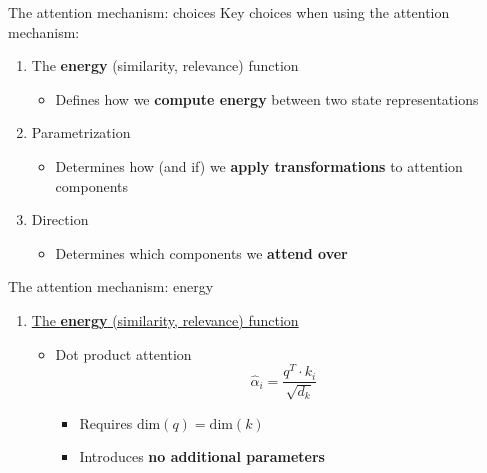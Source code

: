 \documentclass[12pt,aspectratio=169,handout]{beamer}
\begin{document}
\begin{frame}{The attention mechanism: choices}
	Key choices when using the attention mechanism:
	\begin{enumerate}
		\item The \textbf{energy} (similarity, relevance) function
		\begin{itemize}
			\item Defines how we \textbf{compute energy} between two state representations
		\end{itemize}

		\item Parametrization
		
		\begin{itemize}
			\item Determines how (and if) we \textbf{apply transformations} to attention components
		\end{itemize}
		
		\item Direction
		
		\begin{itemize}
			\item Determines which components we \textbf{attend over}
		\end{itemize}

	\end{enumerate}
\end{frame}

\begin{frame}{The attention mechanism: energy}
	\begin{enumerate}
		\item \underline{The \textbf{energy} (similarity, relevance) function}
		\pause
		\begin{itemize}
			\item Dot product attention
				$$
					\hat{\alpha}_i = \frac{q^T \cdot k_i}{\sqrt{d_k} }
				$$
			\pause
			\begin{itemize}
				\item Requires $\text{dim}(q) = \text{dim}(k)$
				\item Introduces \textbf{no additional parameters}
			\end{itemize}

		\end{itemize}
	\end{enumerate}
\end{frame}
\end{document}
